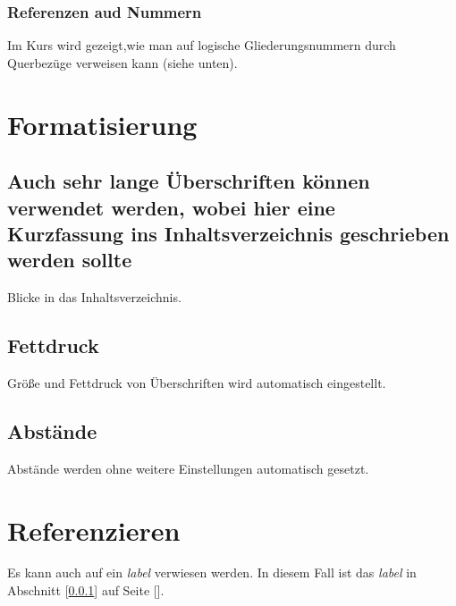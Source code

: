 \documentclass{scrartcl}
\begin{document}
\subsubsection{Referenzen aud Nummern} 
\label{mylabel}
Im Kurs wird gezeigt,wie man auf logische Gliederungsnummern durch Querbezüge
verweisen kann (siehe unten).
\section{Formatisierung}
\subsection[Lange Überschrift]{Auch sehr lange Überschriften können verwendet werden, wobei hier eine Kurzfassung ins Inhaltsverzeichnis geschrieben werden sollte}
Blicke in das Inhaltsverzeichnis.
\subsection{Fettdruck}
Größe und Fettdruck von Überschriften wird automatisch eingestellt.
\subsection{Abstände}
Abstände werden ohne weitere Einstellungen automatisch gesetzt.
\section{Referenzieren}
Es kann auch auf ein {\itshape label} verwiesen werden. In diesem Fall ist das {\itshape label} in Abschnitt [\ref{mylabel}] auf Seite [\pageref{mylabel}].
\end{document}
